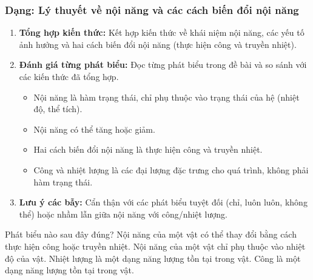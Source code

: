 \subsubsection{Dạng: Lý thuyết về nội năng và các cách biến đổi nội năng}
\begin{phuongphap}
\begin{enumerate}
    \item \textbf{Tổng hợp kiến thức:} Kết hợp kiến thức về khái niệm nội năng, các yếu tố ảnh hưởng và hai cách biến đổi nội năng (thực hiện công và truyền nhiệt).
    \item \textbf{Đánh giá từng phát biểu:} Đọc từng phát biểu trong đề bài và so sánh với các kiến thức đã tổng hợp.
    \begin{itemize}
        \item Nội năng là hàm trạng thái, chỉ phụ thuộc vào trạng thái của hệ (nhiệt độ, thể tích).
        \item Nội năng có thể tăng hoặc giảm.
        \item Hai cách biến đổi nội năng là thực hiện công và truyền nhiệt.
        \item Công và nhiệt lượng là các đại lượng đặc trưng cho quá trình, không phải hàm trạng thái.
    \end{itemize}
    \item \textbf{Lưu ý các bẫy:} Cẩn thận với các phát biểu tuyệt đối (chỉ, luôn luôn, không thể) hoặc nhầm lẫn giữa nội năng với công/nhiệt lượng.
\end{enumerate}
\end{phuongphap}
\begin{vidumau}
Phát biểu nào sau đây đúng?
\choice
{\True Nội năng của một vật có thể thay đổi bằng cách thực hiện công hoặc truyền nhiệt.}
{Nội năng của một vật chỉ phụ thuộc vào nhiệt độ của vật.}
{Nhiệt lượng là một dạng năng lượng tồn tại trong vật.}
{Công là một dạng năng lượng tồn tại trong vật.}
\end{vidumau}

